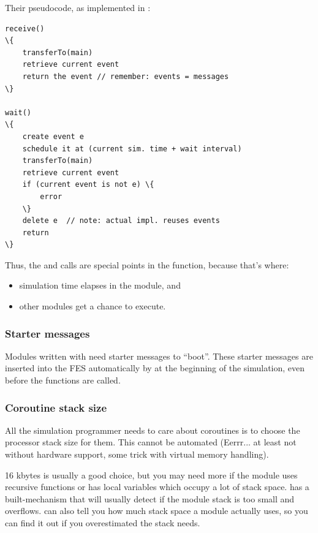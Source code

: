 Their pseudocode, as implemented in {\opp}:


\begin{Verbatim}[commandchars=\\\{\}]
receive()
\{
    transferTo(main)
    retrieve current event
    return the event // remember: events = messages
\}

wait()
\{
    create event e
    schedule it at (current sim. time + wait interval)
    transferTo(main)
    retrieve current event
    if (current event is not e) \{
        error
    \}
    delete e  // note: actual impl. reuses events
    return
\}
\end{Verbatim}



Thus, the  and  calls are
special points in the  function, because that's
where:

\begin{itemize}
  \item{simulation time elapses in the module, and}
  \item{other modules get a chance to execute.}
\end{itemize}


\subsubsection{Starter messages}


Modules written with  need starter
messages to ``boot''.  These starter messages
are inserted into the FES automatically by {\opp} at the
beginning of the simulation, even before the 
functions are called.


\subsubsection{Coroutine stack size}


All the simulation programmer needs to care about coroutines is to
choose the processor stack size for them.
This cannot be automated (Eerrr... at least not without hardware
support, some trick with virtual memory handling).

16 kbytes is usually a good choice, but you may need more if the
module uses recursive functions or has local variables which occupy a
lot of stack space. {\opp} has a built-mechanism that will usually
detect if the module stack is too small and
overflows. {\opp} can also tell you how much
stack space a module actually uses, so you can find
it out if you overestimated the stack needs.


